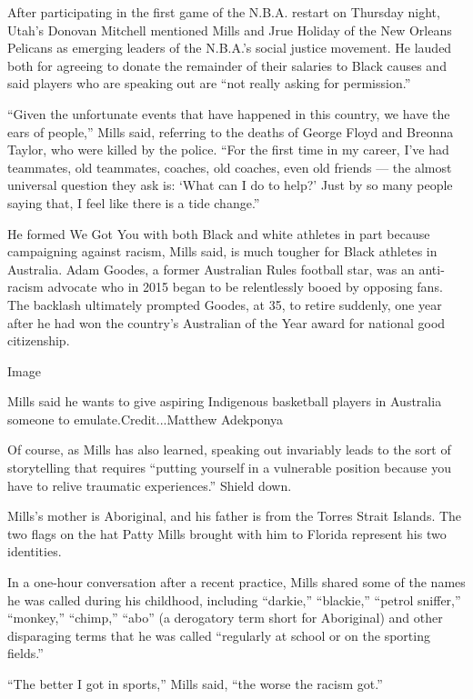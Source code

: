 After participating in the first game of the N.B.A. restart on Thursday
night, Utah's Donovan Mitchell mentioned Mills and Jrue Holiday of the
New Orleans Pelicans as emerging leaders of the N.B.A.'s social justice
movement. He lauded both for agreeing to donate the remainder of their
salaries to Black causes and said players who are speaking out are ``not
really asking for permission.''

``Given the unfortunate events that have happened in this country, we
have the ears of people,'' Mills said, referring to the deaths of George
Floyd and Breonna Taylor, who were killed by the police. ``For the first
time in my career, I've had teammates, old teammates, coaches, old
coaches, even old friends --- the almost universal question they ask is:
`What can I do to help?' Just by so many people saying that, I feel like
there is a tide change.''

He formed We Got You with both Black and white athletes in part because
campaigning against racism, Mills said, is much tougher for Black
athletes in Australia. Adam Goodes, a former Australian Rules football
star, was an anti-racism advocate who in 2015 began to be relentlessly
booed by opposing fans. The backlash ultimately prompted Goodes, at 35,
to retire suddenly, one year after he had won the country's Australian
of the Year award for national good citizenship.

Image

Mills said he wants to give aspiring Indigenous basketball players in
Australia someone to emulate.Credit...Matthew Adekponya

Of course, as Mills has also learned, speaking out invariably leads to
the sort of storytelling that requires ``putting yourself in a
vulnerable position because you have to relive traumatic experiences.''
Shield down.

Mills's mother is Aboriginal, and his father is from the Torres Strait
Islands. The two flags on the hat Patty Mills brought with him to
Florida represent his two identities.

In a one-hour conversation after a recent practice, Mills shared some of
the names he was called during his childhood, including ``darkie,''
``blackie,'' ``petrol sniffer,'' ``monkey,'' ``chimp,'' ``abo'' (a
derogatory term short for Aboriginal) and other disparaging terms that
he was called ``regularly at school or on the sporting fields.''

``The better I got in sports,'' Mills said, ``the worse the racism
got.''

